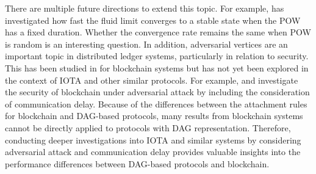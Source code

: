\documentclass[12pt]{article}
\numberwithin{equation}{section}  %
\begin{document}
There are multiple future directions to extend this topic. For example, \cite{Ck21} has investigated how fast the fluid limit converges to a stable state when the POW has a fixed duration. Whether the convergence rate remains the same when POW is random is an interesting question. In addition, adversarial vertices are an important topic in distributed ledger systems, particularly in relation to security. This has been studied in \cite{SS22} for blockchain systems but has not yet been explored in the context of IOTA and other similar protocols. For example, \cite{dembo2020everything} and \cite{gobel2016bitcoin} investigate the security of blockchain under adversarial attack by including the consideration of communication delay. Because of the differences between the attachment rules for blockchain and DAG-based protocols, many results from blockchain systems cannot be directly applied to protocols with DAG representation. Therefore, conducting deeper investigations into IOTA and similar systems by considering adversarial attack and communication delay provides valuable insights into the performance differences between DAG-based protocols and blockchain.
\end{document}
